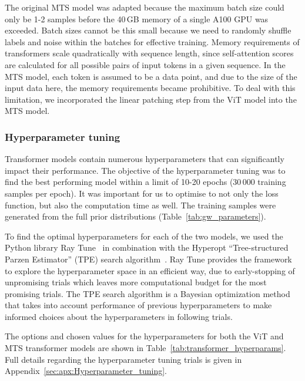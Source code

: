 The original MTS model was adapted because the maximum batch size could only be 1-2 samples before the 40\,GB memory of a single A100 GPU was exceeded. Batch sizes cannot be this small because we need to randomly shuffle labels and noise within the batches for effective training. Memory requirements of transformers scale quadratically with sequence length, since self-attention scores are calculated for all possible pairs of input tokens in a given sequence. In the MTS model, each token is assumed to be a data point, and due to the size of the input data here, the memory requirements became prohibitive. To deal with this limitation, we incorporated the linear patching step from the ViT model into the MTS model.

\subsubsection{Hyperparameter tuning}

Transformer models contain numerous hyperparameters that can significantly impact their performance. The objective of the hyperparameter tuning was to find the best performing model within a limit of 10-20 epochs (30\,000 training samples per epoch). It was important for us to optimise to not only the loss function, but also the computation time as well. The training samples were generated from the full prior distributions (Table~\ref{tab:gw_parameters}). 

To find the optimal hyperparameters for each of the two models, we used the Python library Ray Tune~\cite{liaw2018tune} in combination with the Hyperopt \enquote{Tree-structured Parzen Estimator} (TPE) search algorithm~\cite{Bergstra_Bardenet_Bengio_Kégl_2011}. Ray Tune provides the framework to explore the hyperparameter space in an efficient way, due to early-stopping of unpromising trials which leaves more computational budget for the most promising trials. The TPE search algorithm is a Bayesian optimization method that takes into account performance of previous hyperparameters to make informed choices about the hyperparameters in following trials.

The options and chosen values for the hyperparameters for both the ViT and MTS transformer models are shown in Table~\ref{tab:transformer_hyperparams}. Full details regarding the hyperparameter tuning trials is given in Appendix~\ref{sec:apx:Hyperparameter_tuning}.

